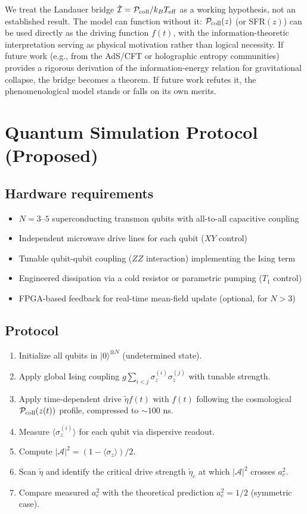 \documentclass[aps,prd,onecolumn]{revtex4-2}
\begin{document}
We treat the Landauer bridge $\dot{\mathcal{I}} = \mathcal{P}_{\rm coll}/k_B T_{\rm eff}$ as a working hypothesis, not an established result. The model can function without it: $\mathcal{P}_{\rm coll}(z)$ (or SFR$(z)$) can be used directly as the driving function $f(t)$, with the information-theoretic interpretation serving as physical motivation rather than logical necessity. If future work (e.g., from the AdS/CFT or holographic entropy communities) provides a rigorous derivation of the information-energy relation for gravitational collapse, the bridge becomes a theorem. If future work refutes it, the phenomenological model stands or falls on its own merits.

\section{Quantum Simulation Protocol (Proposed)}

\subsection{Hardware requirements}

\begin{itemize}
\item $N = 3$--$5$ superconducting transmon qubits with all-to-all capacitive coupling
\item Independent microwave drive lines for each qubit ($XY$ control)
\item Tunable qubit-qubit coupling ($ZZ$ interaction) implementing the Ising term
\item Engineered dissipation via a cold resistor or parametric pumping ($T_1$ control)
\item FPGA-based feedback for real-time mean-field update (optional, for $N > 3$)
\end{itemize}

\subsection{Protocol}

\begin{enumerate}
\item Initialize all qubits in $|0\rangle^{\otimes N}$ (undetermined state).
\item Apply global Ising coupling $g\sum_{i<j}\sigma_z^{(i)}\sigma_z^{(j)}$ with tunable strength.
\item Apply time-dependent drive $\tilde{\eta} f(t)$ with $f(t)$ following the cosmological $\mathcal{P}_{\rm coll}(z(t))$ profile, compressed to $\sim 100$ ns.
\item Measure $\langle\sigma_z^{(i)}\rangle$ for each qubit via dispersive readout.
\item Compute $|\mathcal{A}|^2 = (1 - \langle\sigma_z\rangle)/2$.
\item Scan $\tilde{\eta}$ and identify the critical drive strength $\tilde{\eta}_c$ at which $|\mathcal{A}|^2$ crosses $a_c^2$.
\item Compare measured $a_c^2$ with the theoretical prediction $a_c^2 = 1/2$ (symmetric case).
\end{enumerate}
\end{document}
